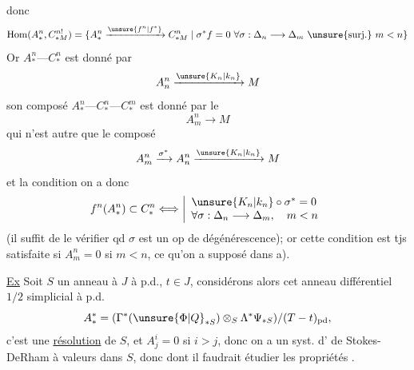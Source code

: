 
donc
\[
\operatorname{Hom}(A_*^n,C_{*M}^{n!})
=\{A_*^n\xrightarrow{\unsure{f^n|f^*}}C_{*M}^n\mid
\sigma^*f=0\ \forall\sigma:\Delta_n\longrightarrow\Delta_m\
\unsure{\text{surj.}}\ m<n\}
\]
Or $A_*^n\text{---}C_*^n$ est donné par 
\[
A_n^n\xrightarrow{\unsure{K_n|k_n}}M
\]
son composé $A_*^n\text{---}C_*^n\text{---}C_*^m$ est donné par le
\[
A_m^n\longrightarrow M
\]
qui n'est autre que le composé
\[
A_m^n\xrightarrow{\sigma^*}A_n^n\xrightarrow{\unsure{K_n|k_n}}M
\]
et la condition  on a donc
\[
f^n(A_*^n)\subset C_*^n
\Longleftrightarrow
\left|\begin{array}{l}
\unsure{K_n|k_n}\circ\sigma^*=0\\
\forall\sigma:\Delta_n\longrightarrow\Delta_m,\quad m<n
\end{array}\right.
\]
(il suffit de le vérifier qd $\sigma$ est un op de dégénérescence); or cette condition est tjs satisfaite si $A_m^n=0$ si $m<n$, ce qu'on a supposé dans a).

\uline{Ex} Soit $S$ un anneau à  $J$ à p.d., $t\in J$, considérons alors cet anneau différentiel $1/2$ simplicial à p.d.
\[
A_*^*=(\Gamma^*(\unsure{\Phi|Q}_{*S})\otimes_S\Lambda^*\Psi_{*S})/(T-t)_{\mathrm{pd}},
\]
c'est une \uline{résolution} de $S$, et $A_j^i=0$ si $i>j$, donc on a un syst. d' de Stokes-DeRham à valeurs dans $S$, donc
dont il faudrait étudier les propriétés .
\margin{\deleted{\unsure{p.d.}}}
